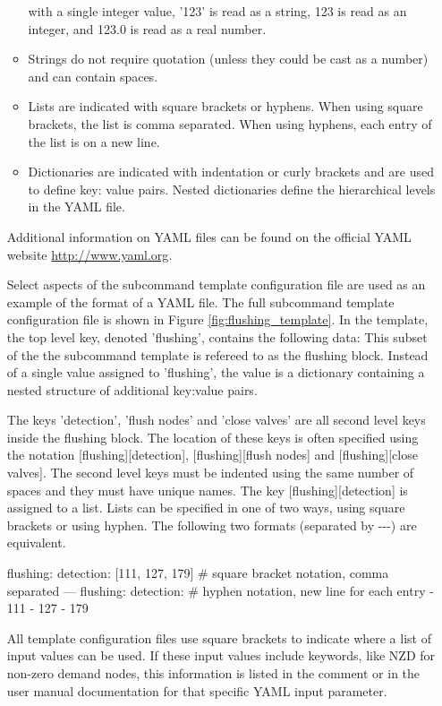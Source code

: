\begin{itemize}
\begin{itemize}
with a single integer value, '123' is read as a string, 123 is read as an integer, and 123.0 is read as a real number.
\item Strings do not require quotation (unless they could be cast as a number) and can contain spaces.
\item Lists are indicated with square brackets or hyphens. When using square brackets, the list is comma separated. When using hyphens, each entry of the list is on a new line.
\item Dictionaries are indicated with indentation or curly brackets and are used to define key: value pairs.  Nested dictionaries define the hierarchical levels in the YAML file.
\end{itemize}
Additional information on YAML files can be found on the official YAML website \url{http://www.yaml.org}.

Select aspects of the  subcommand template configuration file are used as an example of the format of a YAML file. 
The full  subcommand template configuration file is shown in Figure \ref{fig:flushing_template}. 
In the template, the top level key, denoted 'flushing', contains the following data:
This subset of the the  subcommand template is refereed to as the flushing block. Instead of a single 
value assigned to 'flushing', the value is a dictionary containing a nested structure 
of additional key:value pairs. 

The keys 'detection', 'flush nodes' and 'close valves' are all second level keys inside the flushing block. 
The location of these keys is often specified using the notation [flushing][detection], [flushing][flush nodes] and [flushing][close valves]. 
The second level keys must be indented using the same number of spaces and they must have unique names. 
The key [flushing][detection] is assigned to a list. Lists can be specified 
in one of two ways, using square brackets or using hyphen. The following two formats (separated by -\--\--) are equivalent. 
\begin{unknownListing}
flushing:
  detection: [111, 127, 179] # square bracket notation, comma separated
---
flushing:
  detection: # hyphen notation, new line for each entry
  - 111
  - 127
  - 179
\end{unknownListing}
All template configuration files use square brackets to indicate where a list of input values can be used.
If these input values include keywords, like NZD for non-zero demand nodes, this 
information is listed in the comment or in the user manual documentation for 
that specific YAML input parameter.


\end{itemize}
